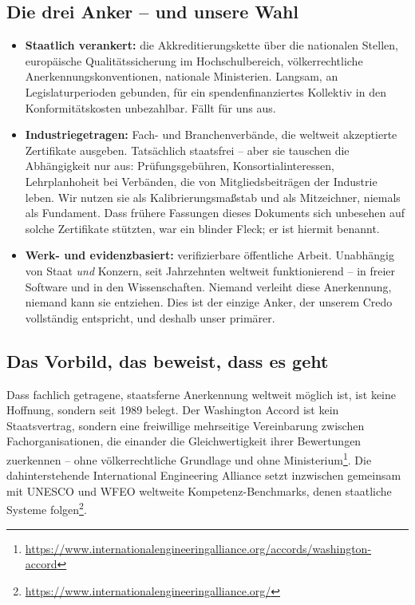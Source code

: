 \documentclass[11pt,a4paper]{article}
\begin{document}
\subsection{Die drei Anker -- und unsere Wahl}
\begin{itemize}[label=--]
    \item \textbf{Staatlich verankert:} die Akkreditierungskette über die nationalen Stellen, europäische Qualitätssicherung im Hochschulbereich, völkerrechtliche Anerkennungskonventionen, nationale Ministerien. Langsam, an Legislaturperioden gebunden, für ein spendenfinanziertes Kollektiv in den Konformitätskosten unbezahlbar. Fällt für uns aus.
    \item \textbf{Industriegetragen:} Fach- und Branchenverbände, die weltweit akzeptierte Zertifikate ausgeben. Tatsächlich staatsfrei -- aber sie tauschen die Abhängigkeit nur aus: Prüfungsgebühren, Konsortialinteressen, Lehrplanhoheit bei Verbänden, die von Mitgliedsbeiträgen der Industrie leben. Wir nutzen sie als Kalibrierungsmaßstab und als Mitzeichner, niemals als Fundament. Dass frühere Fassungen dieses Dokuments sich unbesehen auf solche Zertifikate stützten, war ein blinder Fleck; er ist hiermit benannt.
    \item \textbf{Werk- und evidenzbasiert:} verifizierbare öffentliche Arbeit. Unabhängig von Staat \textit{und} Konzern, seit Jahrzehnten weltweit funktionierend -- in freier Software und in den Wissenschaften. Niemand verleiht diese Anerkennung, niemand kann sie entziehen. Dies ist der einzige Anker, der unserem Credo vollständig entspricht, und deshalb unser primärer.
\end{itemize}

\subsection{Das Vorbild, das beweist, dass es geht}
Dass fachlich getragene, staatsferne Anerkennung weltweit möglich ist, ist keine Hoffnung, sondern seit 1989 belegt. Der Washington Accord ist kein Staatsvertrag, sondern eine freiwillige mehrseitige Vereinbarung zwischen Fachorganisationen, die einander die Gleichwertigkeit ihrer Bewertungen zuerkennen -- ohne völkerrechtliche Grundlage und ohne Ministerium\footnote{\url{https://www.internationalengineeringalliance.org/accords/washington-accord}}. Die dahinterstehende International Engineering Alliance setzt inzwischen gemeinsam mit UNESCO und WFEO weltweite Kompetenz-Benchmarks, denen staatliche Systeme folgen\footnote{\url{https://www.internationalengineeringalliance.org/}}.
\end{document}
